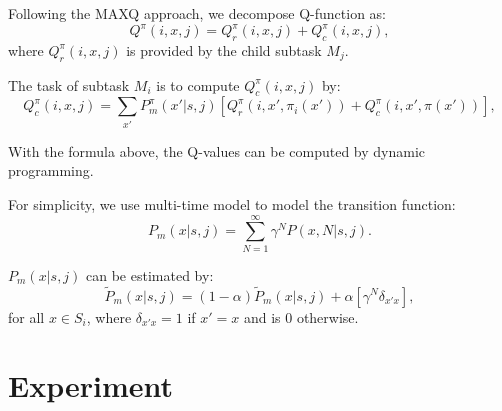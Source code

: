 \documentclass{article} %
\begin{document}

Following the MAXQ approach, we decompose Q-function as:
\begin{equation}
    Q^{\pi}(i, x, j) = Q_r^{\pi}(i, x, j) + Q_c^{\pi}(i, x, j),
    \label{eq:biasedMaxQ}
\end{equation}
where $Q_r^{\pi}(i, x, j)$ is provided by the child subtask $M_j$.

The task of subtask $M_i$ is to compute $Q_c^{\pi}(i, x, j)$ by:
\begin{equation}
    Q_c^{\pi}(i, x, j) = \sum_{x'} P_m^{\pi}(x'|s, j)[Q_r^{\pi}(i, x', \pi_i(x')) + Q_c^{\pi}(i, x', \pi(x'))],
    \label{eq:biasedQc}
\end{equation}

With the formula above, the Q-values can be computed by dynamic programming.

For simplicity, we use multi-time model\cite{SMDP} to model the transition function: 
\begin{equation}
    P_m(x|s, j) = \sum^{\infty}_{N=1} \gamma^N P(x, N|s, j).
    \label{eq:multiProb}
\end{equation}

$P_m(x|s, j)$ can be estimated by:
\begin{equation}
    \tilde{P}_m(x|s, j) = (1-\alpha)\tilde{P}_m(x|s, j) + \alpha [ \gamma^N \delta_{x'x}],
    \label{eq:approxP}
\end{equation}
for all $x \in S_i$, where $\delta_{x'x}=1$ if $x' = x$ and is 0 otherwise.


\section{Experiment}
\end{document}
